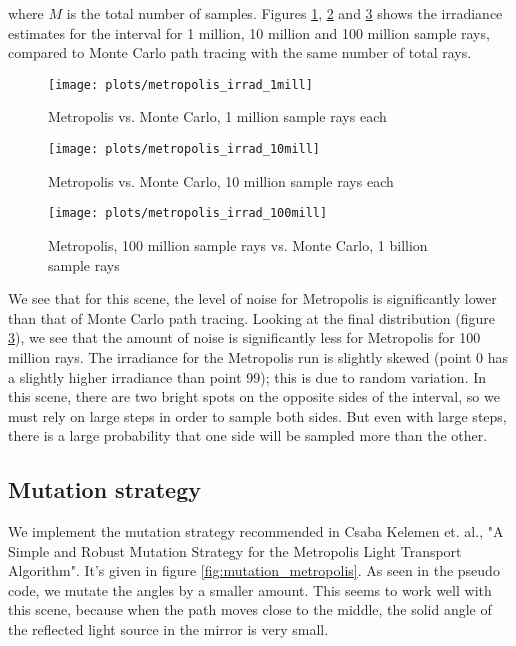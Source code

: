 \documentclass{article} %
\begin{document}
where $M$ is the total number of samples. Figures \ref{fig:metropolis_irrad1}, \ref{fig:metropolis_irrad10} and \ref{fig:metropolis_irrad100} shows the irradiance estimates for the interval for 1 million, 10 million and 100 million sample rays, compared to Monte Carlo path tracing with the same number of total rays.

\begin{figure}[h]
    \centering
    \texttt{[image: plots/metropolis\_irrad\_1mill]}\\
    \caption{Metropolis vs. Monte Carlo, 1 million sample rays each}
    \label{fig:metropolis_irrad1}
\end{figure}

\begin{figure}
    \centering
    \texttt{[image: plots/metropolis\_irrad\_10mill]}\\
    \caption{Metropolis vs. Monte Carlo, 10 million sample rays each}
    \label{fig:metropolis_irrad10}
\end{figure}

\begin{figure}
    \centering
    \texttt{[image: plots/metropolis\_irrad\_100mill]}\\
    \caption{Metropolis, 100 million sample rays vs. Monte Carlo, 1 billion sample rays}
    \label{fig:metropolis_irrad100}
\end{figure}

We see that for this scene, the level of noise for Metropolis is significantly lower than that of Monte Carlo path tracing. Looking at the final distribution (figure \ref{fig:metropolis_irrad100}), we see that the amount of noise is significantly less for Metropolis for 100 million rays. The irradiance for the Metropolis run is slightly skewed (point 0 has a slightly higher irradiance than point 99); this is due to random variation. In this scene, there are two bright spots on the opposite sides of the interval, so we must rely on large steps in order to sample both sides. But even with large steps, there is a large probability that one side will be sampled more than the other.

\subsection*{Mutation strategy}
We implement the mutation strategy recommended in Csaba Kelemen et. al., "A Simple and Robust Mutation Strategy for the Metropolis Light Transport Algorithm". It's given in figure \ref{fig:mutation_metropolis}. As seen in the pseudo code, we mutate the angles by a smaller amount. This seems to work well with this scene, because when the path moves close to the middle, the solid angle of the reflected light source in the mirror is very small.
\end{document}
